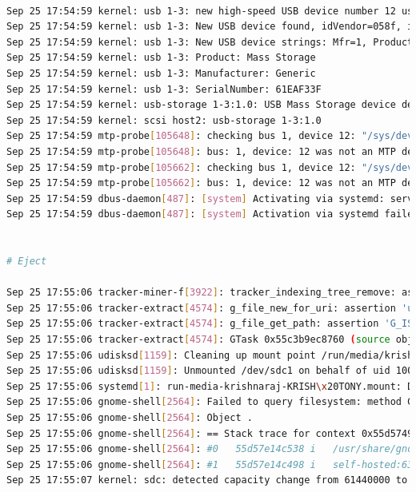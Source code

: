 \documentclass[11pt]{article}
\begin{document}
\begin{lstlisting}[language=bash]
   
Sep 25 17:54:59 kernel: usb 1-3: new high-speed USB device number 12 using xhci_hcd
Sep 25 17:54:59 kernel: usb 1-3: New USB device found, idVendor=058f, idProduct=6387, bcdDevice= 1.00
Sep 25 17:54:59 kernel: usb 1-3: New USB device strings: Mfr=1, Product=2, SerialNumber=3
Sep 25 17:54:59 kernel: usb 1-3: Product: Mass Storage
Sep 25 17:54:59 kernel: usb 1-3: Manufacturer: Generic
Sep 25 17:54:59 kernel: usb 1-3: SerialNumber: 61EAF33F
Sep 25 17:54:59 kernel: usb-storage 1-3:1.0: USB Mass Storage device detected
Sep 25 17:54:59 kernel: scsi host2: usb-storage 1-3:1.0
Sep 25 17:54:59 mtp-probe[105648]: checking bus 1, device 12: "/sys/devices/pci0000:00/0000:00:14.0/usb1/1-3"
Sep 25 17:54:59 mtp-probe[105648]: bus: 1, device: 12 was not an MTP device
Sep 25 17:54:59 mtp-probe[105662]: checking bus 1, device 12: "/sys/devices/pci0000:00/0000:00:14.0/usb1/1-3"
Sep 25 17:54:59 mtp-probe[105662]: bus: 1, device: 12 was not an MTP device
Sep 25 17:54:59 dbus-daemon[487]: [system] Activating via systemd: service name='org.freedesktop.Avahi' unit='dbus-org.freedesktop.Avahi.service' requested by ':1.318' (uid=969 pid=105660 comm="/usr/lib/colord-sane")
Sep 25 17:54:59 dbus-daemon[487]: [system] Activation via systemd failed for unit 'dbus-org.freedesktop.Avahi.service': Unit dbus-org.freedesktop.Avahi.service not found.


# Eject 

Sep 25 17:55:06 tracker-miner-f[3922]: tracker_indexing_tree_remove: assertion 'TRACKER_IS_INDEXING_TREE (tree)' failed
Sep 25 17:55:06 tracker-extract[4574]: g_file_new_for_uri: assertion 'uri != NULL' failed
Sep 25 17:55:06 tracker-extract[4574]: g_file_get_path: assertion 'G_IS_FILE (file)' failed
Sep 25 17:55:06 tracker-extract[4574]: GTask 0x55c3b9ec8760 (source object: 0x55c3ba1399a0, source tag: (nil)) finalized without ever returning (using g_task_return_*()). This potentially indicates a bug in the program.
Sep 25 17:55:06 udisksd[1159]: Cleaning up mount point /run/media/krishnaraj/KRISH TONY (device 8:33 is not mounted)
Sep 25 17:55:06 udisksd[1159]: Unmounted /dev/sdc1 on behalf of uid 1000
Sep 25 17:55:06 systemd[1]: run-media-krishnaraj-KRISH\x20TONY.mount: Deactivated successfully.
Sep 25 17:55:06 gnome-shell[2564]: Failed to query filesystem: method Gio.File.query_filesystem_info_async: At least 4 arguments required, but only 3 passed
Sep 25 17:55:06 gnome-shell[2564]: Object .
Sep 25 17:55:06 gnome-shell[2564]: == Stack trace for context 0x55d57499c540 ==
Sep 25 17:55:06 gnome-shell[2564]: #0   55d57e14c538 i   /usr/share/gnome-shell/extensions/drive-menu@gnome-shell-extensions.gcampax.github.com/extension.js:89 (27fa701741f0 @ 70)
Sep 25 17:55:06 gnome-shell[2564]: #1   55d57e14c498 i   self-hosted:632 (ec406c1a650 @ 15)
Sep 25 17:55:07 kernel: sdc: detected capacity change from 61440000 to 0


\end{lstlisting}
\end{document}
